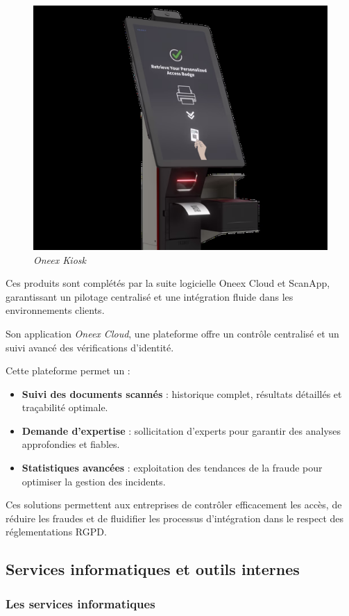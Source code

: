 \begin{itemize}
	      \begin{figure} [H]
		      \centering
		      \includegraphics[width=.5\textwidth]{figures/Oneex kiosk.png}
		      \caption{\textit{Oneex Kiosk}}
		      \label{fig:Oneex Kiosk}
	      \end{figure}
\end{itemize}

Ces produits sont complétés par la suite logicielle Oneex Cloud et ScanApp, garantissant un pilotage centralisé et une intégration fluide dans les environnements clients.

Son application \emph{Oneex Cloud}, une plateforme offre un contrôle centralisé et un suivi avancé des vérifications d’identité.

Cette plateforme permet un :

\begin{itemize}
	\item \textbf{Suivi des documents scannés} : historique complet, résultats détaillés et traçabilité optimale.
	\item \textbf{Demande d’expertise} : sollicitation d’experts pour garantir des analyses approfondies et fiables.
	\item \textbf{Statistiques avancées} : exploitation des tendances de la fraude pour optimiser la gestion des incidents.
\end{itemize}

Ces solutions permettent aux entreprises de contrôler efficacement les accès, de réduire les fraudes et de fluidifier les processus d’intégration dans le respect des réglementations RGPD.

\subsection{Services informatiques et outils internes}

\subsubsection{Les services informatiques}

